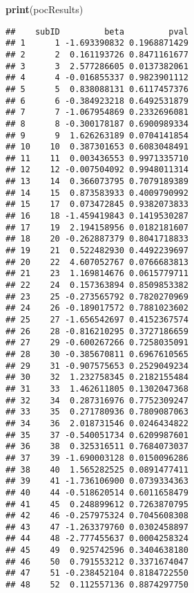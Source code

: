 \documentclass[]{article}
\newenvironment{Shaded}{\begin{snugshade}}{\end{snugshade}}
\newcommand{\DecValTok}[1]{\textcolor[rgb]{0.00,0.00,0.81}{#1}}
\newcommand{\KeywordTok}[1]{\textcolor[rgb]{0.13,0.29,0.53}{\textbf{#1}}}
\newcommand{\NormalTok}[1]{#1}
\newcommand{\OperatorTok}[1]{\textcolor[rgb]{0.81,0.36,0.00}{\textbf{#1}}}
\newcommand{\StringTok}[1]{\textcolor[rgb]{0.31,0.60,0.02}{#1}}
\begin{document}
\begin{Shaded}
\begin{Highlighting}[]
\KeywordTok{print}\NormalTok{(pocResults)}
\end{Highlighting}
\end{Shaded}

\begin{verbatim}
##    subID         beta         pval
## 1      1 -1.693390832 0.1968871429
## 2      2  0.161193726 0.8471161677
## 3      3  2.577286605 0.0137382061
## 4      4 -0.016855337 0.9823901112
## 5      5  0.838088131 0.6117457376
## 6      6 -0.384923218 0.6492531879
## 7      7 -1.067954869 0.2332696081
## 8      8 -0.300178187 0.6900989334
## 9      9  1.626263189 0.0704141854
## 10    10  0.387301653 0.6083048491
## 11    11  0.003436553 0.9971335710
## 12    12 -0.007504092 0.9948011314
## 13    14  0.366073795 0.7079189389
## 14    15  0.873583933 0.4009790992
## 15    17  0.073472845 0.9382073833
## 16    18 -1.459419843 0.1419530287
## 17    19  2.194158956 0.0182181607
## 18    20 -0.262887379 0.8041718833
## 19    21  0.522482930 0.4492239697
## 20    22  4.607052767 0.0766683813
## 21    23  1.169814676 0.0615779711
## 22    24  0.157363894 0.8509853382
## 23    25 -0.273565792 0.7820270969
## 24    26 -0.189017572 0.7881023602
## 25    27 -1.656542697 0.4152367574
## 26    28 -0.816210295 0.3727186659
## 27    29 -0.600267266 0.7258035091
## 28    30 -0.385670811 0.6967610565
## 29    31 -0.907575653 0.2529049234
## 30    32  1.232758345 0.2182155484
## 31    33  1.462611805 0.1302047368
## 32    34  0.287316976 0.7752309247
## 33    35  0.271780936 0.7809087063
## 34    36  2.018731546 0.0246434822
## 35    37 -0.540051734 0.6209987601
## 36    38  0.325316511 0.7684073037
## 37    39 -1.690003128 0.0150096286
## 38    40  1.565282525 0.0891477411
## 39    41 -1.736106900 0.0739334363
## 40    44 -0.518620514 0.6011658479
## 41    45  0.248899612 0.7263870795
## 42    46 -0.257975324 0.7045608308
## 43    47 -1.263379760 0.0302458897
## 44    48 -2.777455637 0.0004258324
## 45    49  0.925742596 0.3404638180
## 46    50  0.791553212 0.3371674047
## 47    51 -0.238452104 0.8184722550
## 48    52  0.112557136 0.8874297750
\end{verbatim}

\begin{Shaded}
\end{Shaded}
\end{document}
